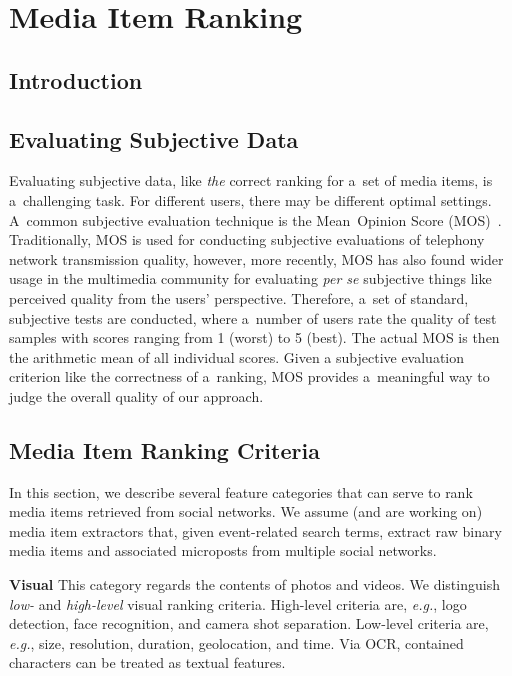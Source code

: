 \chapter{Media Item Ranking}
\label{sec:media-item-ranking}

\ifpdf
    \graphicspath{{7_media_item_ranking/figures/PNG/}{7_media_item_ranking/figures/PDF/}{7_media_item_ranking/figures/}}
\else
    \graphicspath{{7_media_item_ranking/figures/EPS/}{7_media_item_ranking/figures/}}
\fi

\section{Introduction}

\section{Evaluating Subjective Data}

Evaluating subjective data, like \emph{the} correct ranking
for a~set of media items, is a~challenging task.
For different users, there may be different optimal settings.
A~common subjective evaluation technique
is the Mean~Opinion Score (MOS)~\cite{mos1998}.
Traditionally, MOS is used for conducting subjective evaluations
of telephony network transmission quality,
however, more recently, MOS has also found
wider usage in the multimedia community
for evaluating \emph{per se} subjective things
like perceived quality from the users' perspective. 
Therefore, a~set of standard, subjective tests are conducted,
where a~number of users rate the quality of test samples
with scores ranging from 1 (worst) to 5 (best).
The actual MOS is then the arithmetic mean of all individual scores.
Given a subjective evaluation criterion
like the correctness of a~ranking,
MOS provides a~meaningful way to judge the overall quality of our approach.

\section{Media Item Ranking Criteria}
In this section, we describe several feature categories that can serve to rank
media items retrieved from social networks. 
We assume (and are working on) media item extractors that,
given event-related search terms,
extract raw binary media items and associated microposts
from multiple social networks.

\noindent \textbf{Visual}
This category regards the contents of photos and videos.
We distinguish \emph{low-} and \emph{high-level} visual ranking criteria.
High-level criteria are, \emph{e.g.}, logo detection,
face recognition, and camera shot separation.
Low-level criteria are, \emph{e.g.}, size, resolution,
duration, geolocation, and time.
Via OCR, contained characters can be treated as textual features.

